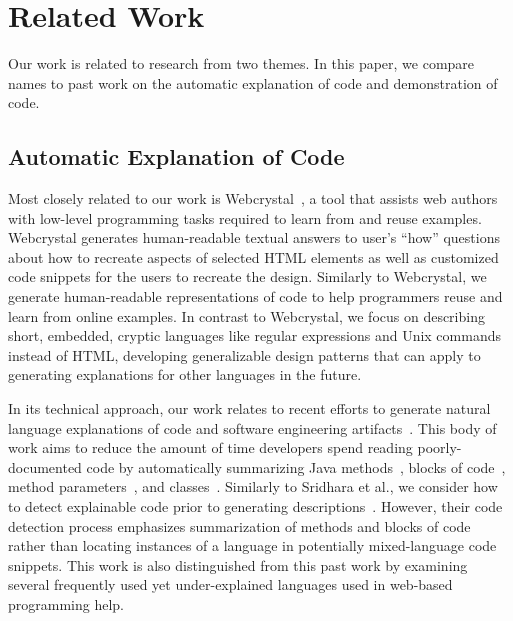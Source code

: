 \section{Related Work}

Our work is related to research from two themes.
In this paper, we compare \Glspl{name} to past work on the automatic explanation of code and demonstration of code.

\subsection{Automatic Explanation of Code}

Most closely related to our work is Webcrystal~\cite{chang_webcrystal_2012}, a tool that assists web authors with low-level programming tasks required to learn from and reuse examples.  
Webcrystal generates human-readable textual answers to user's ``how'' questions about how to recreate aspects of selected HTML elements as well as customized code snippets for the users to recreate the design.
Similarly to Webcrystal, we generate human-readable representations of code to help programmers reuse and learn from online examples.
In contrast to Webcrystal, we focus on describing short, embedded, cryptic languages like regular expressions and Unix commands instead of HTML, developing generalizable design patterns that can apply to generating explanations for other languages in the future.

In its technical approach, our work relates to recent efforts to generate natural language explanations of code and software engineering artifacts~\cite{sridhara_automatically_2011,burden_natural_2011,sridhara_towards_2010,kamimura_towards_2013,mcburney_automatic_2014,sridhara_generating_2011,haiduc_supporting_2010,moreno_automatic_2013}.
This body of work aims to reduce the amount of time developers spend reading poorly-documented code by automatically summarizing Java methods~\cite{sridhara_towards_2010}, blocks of code~\cite{sridhara_automatically_2011}, method parameters~\cite{sridhara_generating_2011}, and classes~\cite{moreno_automatic_2013}.
Similarly to Sridhara et al., we consider how to detect explainable code prior to generating descriptions~\cite{sridhara_automatically_2011,sridhara_towards_2010}.
However, their code detection process emphasizes summarization of methods and blocks of code rather than locating instances of a language in potentially mixed-language code snippets.
This work is also distinguished from this past work by examining  several frequently used yet under-explained languages used in web-based programming help.


